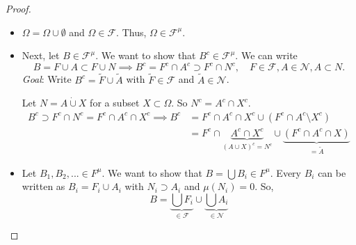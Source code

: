 \documentclass[a4paper]{article}
\begin{document}
\begin{itemize}
\begin{enumerate}[label=(\alph*)]
\begin{proof}
\begin{itemize}
\item $\Omega = \Omega \cup \emptyset$ and $\Omega \in \mathcal F$. Thus, $\Omega \in \mathcal F^\mu$.

\item Next, let $B \in \mathcal F^\mu$. We want to show that $B^c \in \mathcal F^\mu$. We can write 
\[
	B = F \cup A \subset F \cup N \implies B^c = F^c \cap A^c \supset F^c \cap N^c, \quad F \in \mathcal F, A \in \mathcal N, A \subset N .
\]
\emph{Goal}: Write $B^c = \tilde F \cup \tilde A$ with $\tilde F \in \mathcal F$ and $\tilde A \in \mathcal  N$.

Let $N = A \dot \cup X$ for a subset $X \subset \Omega$. So $N^c = A^c \cap X^c$. 
\begin{align*}
	B^c \supset F^c \cap N^c = F^c \cap A^c \cap X^c \implies B^c &= F^c \cap A^c \cap X^c \cup (F^c \cap A^c \setminus X^c) \\
	&= F^c \cap \underbrace{A^c \cap X^c}_{(A \cup X)^c = N^c} \cup \underbrace{(F^c \cap A^c \cap X)}_{= \tilde A}
\end{align*}

\item Let $B_1,B_2,... \in F^\mu$. We want to show that $B = \bigcup B_i \in F^\mu$. Every $B_i$ can be written as $B_i = F_i \cup A_i$ with $N_i \supset A_i$ and $\mu(N_i) = 0$. So, $$B = \underbrace{\bigcup F_i}_{\in \mathcal F} \cup \underbrace{\bigcup A_i}_{\in \mathcal N}$$

\end{itemize}
\end{proof}
\end{enumerate}

\end{itemize}
\end{document}

